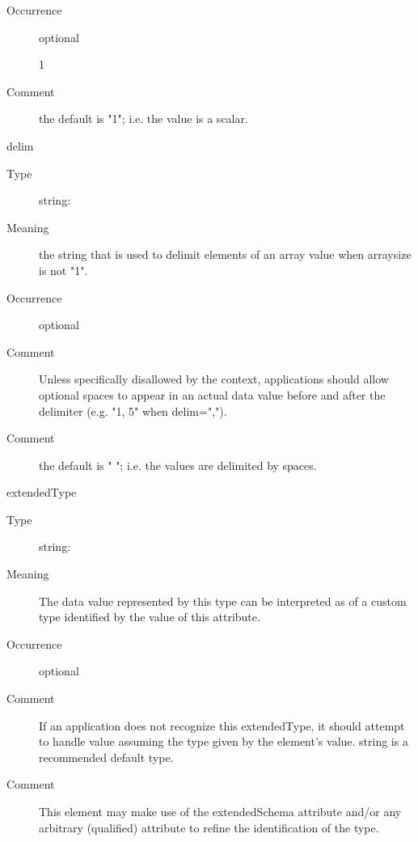 \documentclass[11pt,a4paper]{ivoa}
\begin{document}
\begin{generated}
\begin{bigdescription}
\begin{description}
\item[Occurrence] optional

1
\item[Comment] 
                     the default is {"}1{"}; i.e. the value is a scalar.
                  
\end{description}
\item[delim]
\begin{description}
\item[Type] string: 
\item[Meaning] 
                     the string that is used to delimit elements of an array
                     value when arraysize is not {"}1{"}.
                  
\item[Occurrence] optional
 
\item[Comment] 
                     Unless specifically disallowed by the context, 
                     applications should allow optional spaces to 
                     appear in an actual data value before and after 
                     the delimiter (e.g. {"}1, 5{"} when delim={"},{"}).
                  
\item[Comment] 
                     the default is {"} {"}; i.e. the values are delimited 
                     by spaces.  
                  
\end{description}
\item[extendedType]
\begin{description}
\item[Type] string: 
\item[Meaning] 
                     The data value represented by this type can be
                     interpreted as of a custom type identified by 
                     the value of this attribute.
                  
\item[Occurrence] optional
\item[Comment] 
                     If an application does not recognize this
                     extendedType, it should attempt to handle value
                     assuming the type given by the element's value.
                     string is a recommended default type.
                  
\item[Comment] 
                     This element may make use of the extendedSchema
                     attribute and/or any arbitrary (qualified)
                     attribute to refine the identification of the 
                     type.
                  

\end{description}
\end{bigdescription}
\end{generated}
\end{document}
